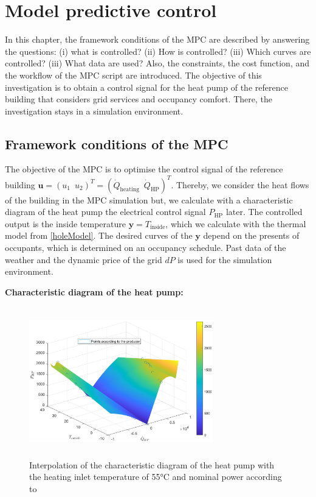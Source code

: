 \chapter{Model predictive control}
\label{ch:mpc}
In this chapter, the framework conditions of the MPC are described by answering the questions: (i) what is controlled? (ii) How is controlled? (iii) Which curves are controlled? (iii) What data are used? Also, the constraints, the cost function, and the workflow of the MPC script are introduced. The objective of this investigation is to obtain a control signal for the heat pump of the reference building that considers grid services and occupancy comfort. There, the investigation stays in a simulation environment. \newline

\section{Framework conditions of the MPC}
\label{section:FrameworkMPC}
The objective of the MPC is to optimise the control signal of the reference building $\mathbf{u} = (u_1 \enspace u_2)^T = (\dot{Q}_\text{heating} \enspace \dot{Q}_\text{HP})^T$. Thereby, we consider the heat flows of the building in the MPC simulation but, we calculate with a characteristic diagram of the heat pump the electrical control signal $P_\text{HP}$ later. The controlled output is the inside temperature $\mathbf{y} = T_\text{inside}$, which we calculate with the thermal model from \autoref{holeModel}. The desired curves of the $\mathbf{y}$ depend on the presents of occupants, which is determined on an occupancy schedule. Past data of the weather and the dynamic price of the grid $dP$  is used for the simulation environment. \newline

\textbf{Characteristic diagram of the heat pump:}\newline
    \begin{figure}[h]
            \centering
            \includegraphics[width=8cm,height=6.5cm]{figure/HeatPumpV55nenn.eps}
           \caption{Interpolation of the characteristic diagram of the heat pump with the heating inlet temperature of 55°C and nominal power according to \cite{TUM}}
           \label{fig:HeatpumpKennfeld}
    \end{figure}
    
